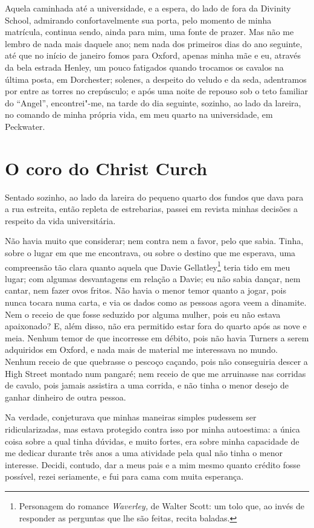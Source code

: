Aquela caminhada até a universidade, e a espera, do lado de fora da
Divinity School, admirando confortavelmente sua porta, pelo momento de
minha matrícula, continua sendo, ainda para mim, uma fonte de prazer.
Mas não me lembro de nada mais daquele ano; nem nada dos primeiros dias
do ano seguinte, até que no início de janeiro fomos para Oxford, apenas
minha mãe e eu, através da bela estrada Henley, um pouco fatigados
quando trocamos os cavalos na última posta, em Dorchester; solenes, a
despeito do veludo e da seda, adentramos por entre as torres no
crepúsculo; e após uma noite de repouso sob o teto familiar do
``Angel'', encontrei"-me, na tarde do dia seguinte, sozinho, ao lado da
lareira, no comando de minha própria vida, em meu quarto na
universidade, em Peckwater.

\chapter{O coro do Christ Curch} %

Sentado sozinho, ao lado da lareira do pequeno quarto dos fundos
que dava para a rua estreita, então repleta de estrebarias, passei em
revista minhas decisões a respeito da vida universitária.

Não havia muito que considerar; nem contra nem a favor, pelo que sabia.
Tinha, sobre o lugar em que me encontrava, ou sobre o destino que me
esperava, uma compreensão tão clara quanto aquela que Davie
Gellatley\footnote{Personagem do romance \textit{Waverley,} de Walter
  Scott: um tolo que, ao invés de responder as perguntas que lhe são
  feitas, recita baladas.} teria tido em meu lugar; com
algumas desvantagens em relação a Davie; eu não sabia dançar, nem
cantar, nem fazer ovos fritos. Não havia o menor temor quanto a jogar,
pois nunca tocara numa carta, e via os dados como as pessoas agora veem
a dinamite. Nem o receio de que fosse seduzido por alguma mulher, pois
eu não estava apaixonado? E, além disso, não era permitido estar fora do
quarto após as nove e meia. Nenhum temor de que incorresse em débito,
pois não havia Turners a serem adquiridos em Oxford, e nada mais de
material me interessava no mundo. Nenhum receio de que quebrasse o
pescoço caçando, pois não conseguiria descer a High Street montado num
pangaré; nem receio de que me arruinasse nas corridas de cavalo, pois
jamais assistira a uma corrida, e não tinha o menor desejo de ganhar
dinheiro de outra pessoa.

Na verdade, conjeturava que minhas maneiras simples pudessem ser
ridicularizadas, mas estava protegido contra isso por minha autoestima:
a única coisa sobre a qual tinha dúvidas, e muito fortes, era sobre
minha capacidade de me dedicar durante três anos a uma atividade pela
qual não tinha o menor interesse. Decidi, contudo, dar a meus pais e a
mim mesmo quanto crédito fosse possível, rezei seriamente, e fui para
cama com muita esperança.

